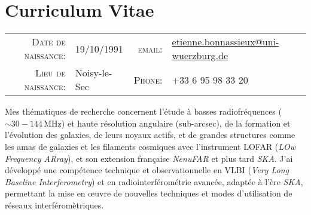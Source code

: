 


\vspace{-4cm}

\chapter{Curriculum Vitae} \label{CV} 

\vspace{-0.2cm}
\begin{center}
\begin{tabular}{rl|rl}
\textsc{Date de naissance:} & 19/10/1991 &
\textsc{email:} & \href{mailto:etienne.bonnassieux@obspm.fr}{etienne.bonnassieux@uni-wuerzburg.de}\\
\textsc{Lieu de naissance:} &Noisy-le-Sec &
\textsc{Phone:} & +33 6 95 98 33 20
\end{tabular}
\end{center}

\vspace{0.3cm}


Mes thématiques de recherche concernent l’étude \`a basses radiofréquences ($\sim30-144$\,MHz) et haute résolution angulaire (sub-arcsec), de la formation et l’évolution des galaxies, de leurs noyaux actifs, et de grandes structures comme les amas de galaxies et les filaments cosmiques avec  l'instrument LOFAR (\textit{LOw Frequency ARray}), et son extension française \textit{NenuFAR} et plus tard \textit{SKA}. J’ai développé une compétence technique et observationnelle en VLBI (\textit{Very Long Baseline Interferometry}) et en radiointerférométrie avancée, adaptée à l’ère \textit{SKA}, permettant la mise en {\oe}uvre de nouvelles techniques et modes d’utilisation de réseaux interféromètriques.




